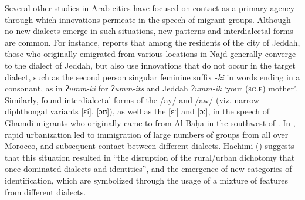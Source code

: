 \documentclass[output=paper]{langsci/langscibook}
\begin{document}
Several other studies in Arab cities have focused on contact as a primary agency through which innovations permeate in the speech of migrant groups. Although no new dialects emerge in such situations, new patterns and interdialectal forms are common. For instance, \citet{Al-Essa2009} reports that among the residents of the city of Jeddah, those who originally emigrated from various locations in Najd generally converge to the dialect of Jeddah, but also use innovations that do not occur in the target dialect, such as the second person singular feminine suffix -\textit{ki} in words ending in a consonant, as in \textit{ʔumm-ki} for  \textit{ʔumm-its} and Jeddah \textit{ʔumm-ik} ‘your (\textsc{sg.f}) mother’. Similarly, \citet{Alghamdi2014} found interdialectal forms of the  /ay/ and /aw/ (viz. narrow diphthongal variants [ɛi], [ɔʊ]), as well as the  [ɛː] and [ɔː], in the speech of {Ghamdi} migrants who originally came to  from Al-Bāḥa in the southwest of . In , rapid urbanization led to immigration of large numbers of groups from all over Morocco, and subsequent contact between different dialects. Hachimi (\citeyear[97]{Hachimi2007}) suggests that this situation resulted in “the disruption of the rural/urban dichotomy that once dominated  dialects and identities”, and the emergence of new categories of identification, which are symbolized through the usage of a mixture of features from different dialects.
\end{document}
